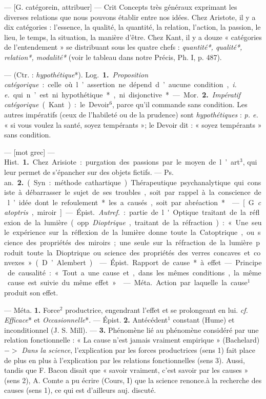 \begin{itemize}[leftmargin=1cm, label=, itemsep=11pt]
 — [G. catégorein, attribuer]
— \si{Crit} Concepts très généraux
exprimant les diverses relations que
nous pouvons établir entre nos idées.
Chez Aristote, il y a dix catégories :
l'essence, la qualité, la quantité, la
relation, l’action, la passion, le lieu,
le temps, la situation, la manière
d’être. Chez Kant, il y a douze « catégories de l’entendement » se distribuant sous les quatre chefs : {\it quantité*, qualité*, relation*, modalité*}
(voir le tableau dans notre Précis,
Ph. I, p. 487).

 — (Ctr. : {\it hypothétique}*).
\si{Log.} {\bf 1.} {\it Proposition catégorique} :
celle où l’assertion ne dépend d’aucune condition, {\it i. e.} qui n’est ni
hypothétique*, ni disjonctive*.

— \si{Mor.} {\bf 2.} {\it Impératif catégorique}
(Kant) : le Devoir$^6$, parce qu'il
commande sans condition. Les
autres impératifs (ceux de l’habileté
ou de la prudence) sont {\it hypothétiques} : {\it p. e.} « si vous voulez la santé,
soyez tempérants »; le Devoir dit :
« soyez tempérants » sans condition.

 — [mot grec] — \si{Hist.} {\bf 1.} Chez
Arisiote : purgation des passions par
le moyen de l’art$^3$, qui leur permet
de s’épancher sur des objets fictifs.
— \si{Ps. an.} {\bf 2.} (Syn. : méthode cathartique). Thérapeutique psychanalytique qui consiste à débarrasser le
sujet de ses troubles, soit par rappel
à la conscience de l’idée dont le
refoulement* les a causés, soit par
abréaction*.

 — [G. {\it catoptris}, miroir] —
\si{Épist.} {\it Autref.} : partie de l'Optique
traitant de la réflexion de la lumière
(opp. {\it Dioptrique}, traitant de la
réfraction) : « Une seule expérience
sur la réflexion de la lumière donne
toute la Catoptrique, ou science des
propriétés des miroirs; une seule sur
la réfraction de la lumière produit...
toute la Dioptrique ou science des

propriétés des verres concaves et
convexes » (D’Alembert).

 — \si{Épist.} Rapport de cause*
à effet. — Principe de causalité :
« Tout a une cause et, dans les
mêmes conditions, la même cause
est suivie du même effet. »

 — \si{Méta.} Action par laquelle la cause$^1$ produit son effet.

 — Méta. {\bf 1.} Force$^2$ productrice,
engendrant l'effet et se prolongeant
en lui. {\it cf.} {\it Efficace}* et {\it Occasionnelle}*. — Épist. {\bf 2.} Antécédent$^1$
constant (Hume) et inconditionnel
(J. S. Mill). — {\bf 3.} Phénomène lié au
phénomène considéré par une relation fonctionnelle : « La cause n’est
jamais vraiment empirique » (Bachelard) $->$ {\it Dans la science}, l'explication par les forces productrices
(sens 1) fait place de plus en plus à
l’explication par les relations fonctionnelles (sens 3). Aussi, tandis
que F. Bacon disait que « savoir
vraiment, c’est savoir par les causes »
(sens 2), A. Comte a pu écrire
(Cours, I) que la science renonce.à
la recherche des causes (sens 1), ce
qui est d'ailleurs auj. discuté.


\end{itemize}
